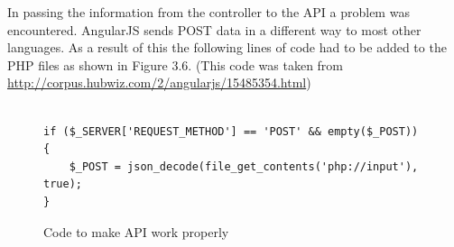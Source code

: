 In passing the information from the controller to the API a problem was encountered. AngularJS sends POST data in a different way to most other languages. As a result of this the following lines of code had to be added to the PHP files as shown in Figure 3.6. (This code was taken from \url{http://corpus.hubwiz.com/2/angularjs/15485354.html})
\begin{center} 
\begin{figure}[H]
\begin{verbatim}

if ($_SERVER['REQUEST_METHOD'] == 'POST' && empty($_POST)) {
    $_POST = json_decode(file_get_contents('php://input'), true);
}
\end{verbatim}
\caption{Code to make API work properly}
\end{figure}
\end{center}

